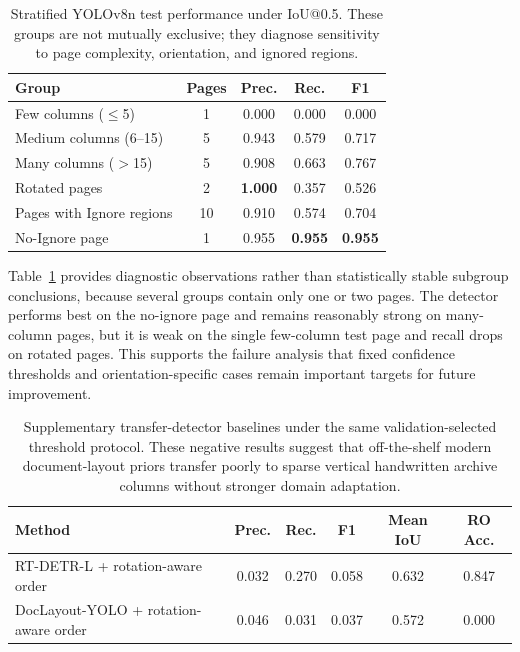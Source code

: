 \documentclass[pdflatex,sn-mathphys-num]{sn-jnl}
\begin{document}
\begin{table}[t]
\centering
\scriptsize\setlength{\tabcolsep}{3pt}
\caption{Stratified YOLOv8n test performance under IoU@0.5. These groups are not mutually exclusive; they diagnose sensitivity to page complexity, orientation, and ignored regions.}
\label{tab:stratified_yolo}
\begin{tabular}{lcccc}
\toprule
Group & Pages & Prec. & Rec. & F1 \\
\midrule
Few columns ($\leq$5) & 1 & 0.000 & 0.000 & 0.000 \\
Medium columns (6--15) & 5 & 0.943 & 0.579 & 0.717 \\
Many columns ($>$15) & 5 & 0.908 & 0.663 & 0.767 \\
Rotated pages & 2 & \textbf{1.000} & 0.357 & 0.526 \\
Pages with Ignore regions & 10 & 0.910 & 0.574 & 0.704 \\
No-Ignore page & 1 & 0.955 & \textbf{0.955} & \textbf{0.955} \\
\bottomrule
\end{tabular}
\end{table}

Table~\ref{tab:stratified_yolo} provides diagnostic observations rather than statistically stable subgroup conclusions, because several groups contain only one or two pages. The detector performs best on the no-ignore page and remains reasonably strong on many-column pages, but it is weak on the single few-column test page and recall drops on rotated pages. This supports the failure analysis that fixed confidence thresholds and orientation-specific cases remain important targets for future improvement.

\begin{table}[t]
\centering
\scriptsize\setlength{\tabcolsep}{3pt}
\caption{Supplementary transfer-detector baselines under the same validation-selected threshold protocol. These negative results suggest that off-the-shelf modern document-layout priors transfer poorly to sparse vertical handwritten archive columns without stronger domain adaptation.}
\label{tab:transfer_baselines}
\begin{tabular}{lccccc}
\toprule
Method & Prec. & Rec. & F1 & Mean IoU & RO Acc. \\
\midrule
RT-DETR-L + rotation-aware order & 0.032 & 0.270 & 0.058 & 0.632 & 0.847 \\
DocLayout-YOLO + rotation-aware order & 0.046 & 0.031 & 0.037 & 0.572 & 0.000 \\
\bottomrule
\end{tabular}
\end{table}
\end{document}

